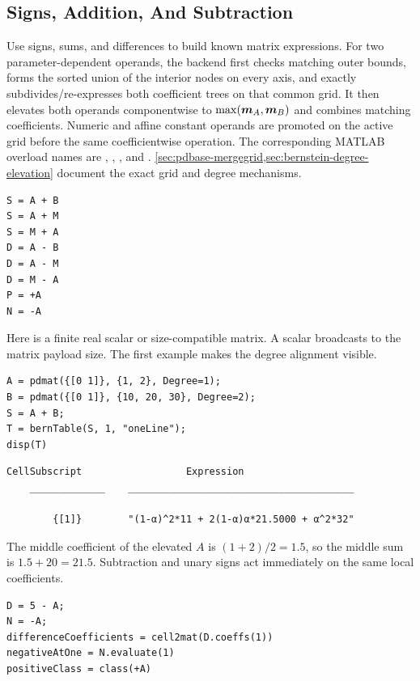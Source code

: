 \subsection{Signs, Addition, And Subtraction}

Use signs, sums, and differences to build known matrix expressions. For two parameter-dependent operands, the backend first checks matching outer bounds, forms the sorted union of the interior nodes on every axis, and exactly subdivides/re-expresses both coefficient trees on that common grid. It then elevates both operands componentwise to $\max(\boldsymbol{m}_A,\boldsymbol{m}_B)$ and combines matching coefficients. Numeric and affine constant operands are promoted on the active grid before the same coefficientwise operation. The corresponding MATLAB overload names are , , , and . \cref{sec:pdbase-mergegrid,sec:bernstein-degree-elevation} document the exact grid and degree mechanisms.

\syntaxhead
\begin{lstlisting}[style=dpsyntax]
S = A + B
S = A + M
S = M + A
D = A - B
D = A - M
D = M - A
P = +A
N = -A
\end{lstlisting}

Here  is a finite real scalar or size-compatible matrix.  A scalar broadcasts to the matrix payload size.  The first example makes the degree alignment visible.

\examplehead
\begin{lstlisting}[style=dpmatlab]
A = pdmat({[0 1]}, {1, 2}, Degree=1);
B = pdmat({[0 1]}, {10, 20, 30}, Degree=2);
S = A + B;
T = bernTable(S, 1, "oneLine");
disp(T)
\end{lstlisting}

\begin{lstlisting}[style=dpoutput]
    CellSubscript                  Expression
    _____________    _______________________________________

        {[1]}        "(1-α)^2*11 + 2(1-α)α*21.5000 + α^2*32"
\end{lstlisting}

The middle coefficient of the elevated $A$ is $(1+2)/2=1.5$, so the middle sum is $1.5+20=21.5$. Subtraction and unary signs act immediately on the same local coefficients.

\begin{lstlisting}[style=dpmatlab]
D = 5 - A;
N = -A;
differenceCoefficients = cell2mat(D.coeffs(1))
negativeAtOne = N.evaluate(1)
positiveClass = class(+A)
\end{lstlisting}

